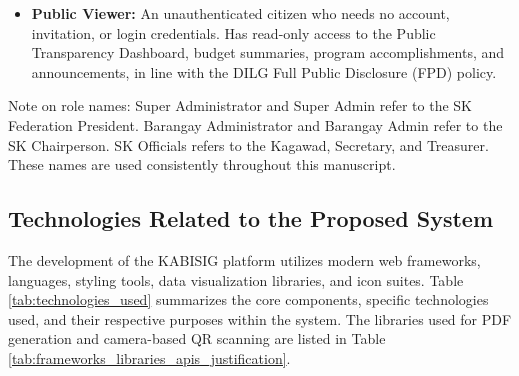 \begin{itemize}
    \item \textbf{Public Viewer:} An unauthenticated citizen who needs no account, invitation, or login credentials. Has read-only access to the Public Transparency Dashboard, budget summaries, program accomplishments, and announcements, in line with the DILG Full Public Disclosure (FPD) policy.
\end{itemize}

\vspace{3mm}
\noindent Note on role names: Super Administrator and Super Admin refer to the SK Federation President. Barangay Administrator and Barangay Admin refer to the SK Chairperson. SK Officials refers to the Kagawad, Secretary, and Treasurer. These names are used consistently throughout this manuscript.
\vspace{5mm}

\subsection{Technologies Related to the Proposed System}
\label{subsec:technologies_related_to_the_proposed_system}

\hspace*{\parindent}The development of the KABISIG platform utilizes modern web frameworks, languages, styling tools, data visualization libraries, and icon suites. Table \ref{tab:technologies_used} summarizes the core components, specific technologies used, and their respective purposes within the system. The libraries used for PDF generation and camera-based QR scanning are listed in Table \ref{tab:frameworks_libraries_apis_justification}.

